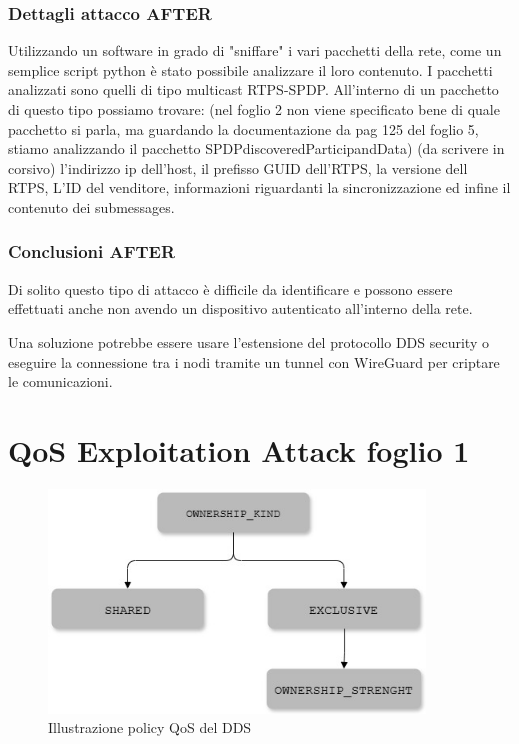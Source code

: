 \subsubsection{Dettagli attacco AFTER}
Utilizzando un software in grado di "sniffare" i vari pacchetti della
rete, come un semplice script python è stato possibile analizzare il loro
contenuto. I pacchetti analizzati sono quelli di tipo multicast RTPS-SPDP.
All'interno di un pacchetto di questo tipo possiamo trovare: (nel foglio 2
non viene specificato bene di quale pacchetto si parla, ma guardando la documentazione
da pag 125 del foglio 5, stiamo analizzando il pacchetto SPDPdiscoveredParticipandData)
(da scrivere in corsivo) l'indirizzo ip dell'host, il prefisso GUID dell'RTPS,
la versione dell RTPS, L'ID del venditore, informazioni riguardanti la sincronizzazione
ed infine il contenuto dei submessages.\cite{White2017AnII}




\subsubsection{Conclusioni AFTER}
Di solito questo tipo di attacco è difficile da identificare e possono essere
effettuati anche non avendo un dispositivo autenticato all'interno della rete.

Una soluzione potrebbe essere usare l'estensione del protocollo DDS security o 
eseguire la connessione tra i nodi tramite un tunnel con WireGuard per criptare
le comunicazioni.


\section{QoS Exploitation Attack foglio 1}


%     




\begin{figure}[H]
    \centering
    \includegraphics[width=10cm, keepaspectratio]{img/Policy QoS DDS_2.jpg}
    \caption{Illustrazione policy QoS del DDS}\label{Mappa QoS}
\end{figure}


